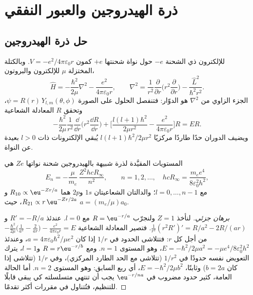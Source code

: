 \section{ذرة الهيدروجين والعبور النفقي}

\subsection*{حل ذرة الهيدروجين}

للإلكترون ذي الشحنة $-e$ حول نواة شحنتها $+e$ كمون $V = -e^2/
4\pi\varepsilon_0r$. وبالكتلة المختزلة $\mu$ للإلكترون والبروتون،
\[
\hat H = -\frac{\hbar^2}{2\mu}\nabla^2 - \frac{e^2}{4\pi\varepsilon_0r},\qquad
\nabla^2 = \frac{1}{r^2}\frac{\partial}{\partial r}\Big(r^2\frac{\partial}{
\partial r}\Big) - \frac{\hat L^2}{\hbar^2r^2}.
\]
الجزء الزاوي من $\nabla^2$ هو  الدوّار: فتنفصل الحلول
على الصورة $\psi = R(r)\,Y_{l,m}(\theta,\phi)$، وتحقق $R$ المعادلة
الشعاعية
\[
-\frac{\hbar^2}{2\mu}\frac{1}{r^2}\frac{\dd}{\dd r}\Big(r^2\frac{\dd R}{\dd r}
\Big) + \Big[\frac{l(l+1)\hbar^2}{2\mu r^2} - \frac{e^2}{4\pi\varepsilon_0r}
\Big]R = ER.
\]
ويضيف الدوران حدًا طاردًا مركزيًا $l(l+1)\hbar^2/2\mu r^2$ يُبقي
الإلكترونات ذات $l > 0$ بعيدة عن النواة.

\begin{theorem}\label{thm:b3:quantum-model-systems:hydrogen}
المستويات المقيَّدة لذرة شبيهة بالهيدروجين شحنة نواتها $Ze$ هي
\[
E_n = -\frac{\mu}{m_e}\,\frac{Z^2hcR_\infty}{n^2}, \qquad n = 1, 2, \dots,
\quad hcR_\infty = \frac{m_ee^4}{8\varepsilon_0^2h^2},
\]
مع $l = 0, \dots, n - 1$؛ والدالتان الشعاعيتان $1s$ و$2p$ هما $R_{10}
\propto \eu^{-Zr/a}$ و$R_{21} \propto r\,\eu^{-Zr/2a}$، حيث $a =
(m_e/\mu)a_0$.
\end{theorem}

\begin{proof}[برهان جزئي]
لنأخذ $Z = 1$ ولنجرّب $R = \eu^{-r/a}$ مع $l = 0$. عندئذ $R' = -R/a$ 
و$\frac{1}{r^2}(r^2R')' = R/a^2 - 2R/(ar)$. فتصير المعادلة الشعاعية
$-\frac{\hbar^2}{2\mu}\big(\frac{1}{a^2} - \frac{2}{ar}\big) - \frac{e^2}{4\pi
\varepsilon_0r} = E$ من أجل كل $r$: فتتلاشى الحدود في $1/r$ إذا كان $a =
4\pi\varepsilon_0\hbar^2/\mu e^2$، وعندئذ $E = -\hbar^2/2\mu a^2 = -\mu
e^4/8\varepsilon_0^2h^2$، وهو المستوى $n = 1$. ومع $R = r\eu^{-r/b}$ و$l = 1$،
يترك التعويض نفسه حدودًا في $1/r^2$ (تتلاشى مع الحد
الطارد المركزي)، وفي $1/r$ (تتلاشى إذا كان $b = 2a$) وثابتًا، $E =
-\hbar^2/2\mu b^2$، أي ربع السابق: وهو المستوى $n = 2$. أما الحالة
العامة، كثير حدود مضروب في $\eu^{-r/na}$ يجب أن تنتهي متسلسلته كي يبقى
قابلًا للتنظيم، فتُتناول في مقررات أكثر تقدمًا.
\end{proof}

